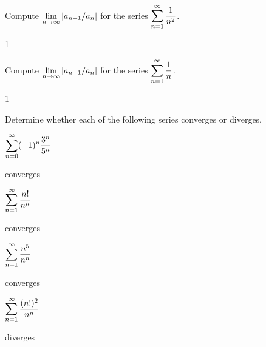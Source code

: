 \begin{exercises}

\begin{exercise} Compute $\displaystyle\lim_{n\to\infty} |a_{n+1}/a_n|$ for the series
$\displaystyle\sum_{n=1}^\infty {1\over n^2}$.
\begin{answer} 1
\end{answer}\end{exercise}

\begin{exercise} Compute $\displaystyle\lim_{n\to\infty} |a_{n+1}/a_n|$ for the series
$\displaystyle\sum_{n=1}^\infty {1\over n}$.
\begin{answer} 1
\end{answer}\end{exercise}

Determine whether each of the following series converges or diverges.

\begin{exercise} $\displaystyle\sum_{n=0}^\infty (-1)^{n}{3^n\over 5^n}$
\begin{answer} converges
\end{answer}\end{exercise}

\begin{exercise} $\displaystyle\sum_{n=1}^\infty {n!\over n^n}$
\begin{answer} converges
\end{answer}\end{exercise}

\begin{exercise} $\displaystyle\sum_{n=1}^\infty {n^5\over n^n}$
\begin{answer} converges
\end{answer}\end{exercise}

\begin{exercise} $\displaystyle\sum_{n=1}^\infty {(n!)^2\over n^n}$
\begin{answer} diverges
\end{answer}\end{exercise}

\end{exercises}
